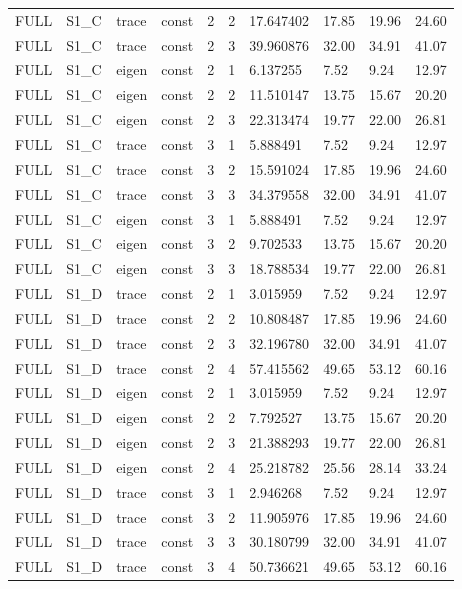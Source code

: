 \begin{tabular}{llllllllll}
FULL & S1\_C & trace & const & 2 & 2 & 17.647402 & 17.85 & 19.96 & 24.60 \\
FULL & S1\_C & trace & const & 2 & 3 & 39.960876 & 32.00 & 34.91 & 41.07 \\
FULL & S1\_C & eigen & const & 2 & 1 & 6.137255 & 7.52 & 9.24 & 12.97 \\
FULL & S1\_C & eigen & const & 2 & 2 & 11.510147 & 13.75 & 15.67 & 20.20 \\
FULL & S1\_C & eigen & const & 2 & 3 & 22.313474 & 19.77 & 22.00 & 26.81 \\
FULL & S1\_C & trace & const & 3 & 1 & 5.888491 & 7.52 & 9.24 & 12.97 \\
FULL & S1\_C & trace & const & 3 & 2 & 15.591024 & 17.85 & 19.96 & 24.60 \\
FULL & S1\_C & trace & const & 3 & 3 & 34.379558 & 32.00 & 34.91 & 41.07 \\
FULL & S1\_C & eigen & const & 3 & 1 & 5.888491 & 7.52 & 9.24 & 12.97 \\
FULL & S1\_C & eigen & const & 3 & 2 & 9.702533 & 13.75 & 15.67 & 20.20 \\
FULL & S1\_C & eigen & const & 3 & 3 & 18.788534 & 19.77 & 22.00 & 26.81 \\
FULL & S1\_D & trace & const & 2 & 1 & 3.015959 & 7.52 & 9.24 & 12.97 \\
FULL & S1\_D & trace & const & 2 & 2 & 10.808487 & 17.85 & 19.96 & 24.60 \\
FULL & S1\_D & trace & const & 2 & 3 & 32.196780 & 32.00 & 34.91 & 41.07 \\
FULL & S1\_D & trace & const & 2 & 4 & 57.415562 & 49.65 & 53.12 & 60.16 \\
FULL & S1\_D & eigen & const & 2 & 1 & 3.015959 & 7.52 & 9.24 & 12.97 \\
FULL & S1\_D & eigen & const & 2 & 2 & 7.792527 & 13.75 & 15.67 & 20.20 \\
FULL & S1\_D & eigen & const & 2 & 3 & 21.388293 & 19.77 & 22.00 & 26.81 \\
FULL & S1\_D & eigen & const & 2 & 4 & 25.218782 & 25.56 & 28.14 & 33.24 \\
FULL & S1\_D & trace & const & 3 & 1 & 2.946268 & 7.52 & 9.24 & 12.97 \\
FULL & S1\_D & trace & const & 3 & 2 & 11.905976 & 17.85 & 19.96 & 24.60 \\
FULL & S1\_D & trace & const & 3 & 3 & 30.180799 & 32.00 & 34.91 & 41.07 \\
FULL & S1\_D & trace & const & 3 & 4 & 50.736621 & 49.65 & 53.12 & 60.16 \\

\end{tabular}
